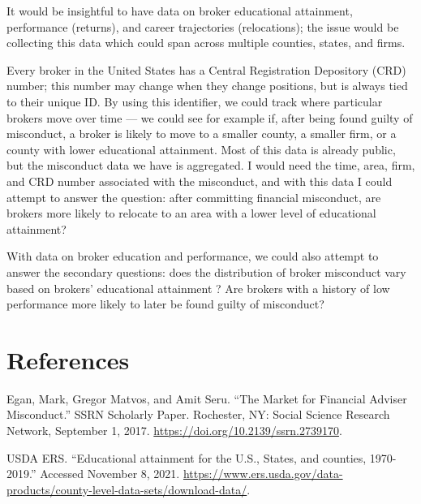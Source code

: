 \documentclass[
]{article}
\begin{document}
It would be insightful to have data on broker educational attainment,
performance (returns), and career trajectories (relocations); the issue
would be collecting this data which could span across multiple counties,
states, and firms.

Every broker in the United States has a Central Registration Depository
(CRD) number; this number may change when they change positions, but is
always tied to their unique ID. By using this identifier, we could track
where particular brokers move over time --- we could see for example if,
after being found guilty of misconduct, a broker is likely to move to a
smaller county, a smaller firm, or a county with lower educational
attainment. Most of this data is already public, but the misconduct data
we have is aggregated. I would need the time, area, firm, and CRD number
associated with the misconduct, and with this data I could attempt to
answer the question: after committing financial misconduct, are brokers
more likely to relocate to an area with a lower level of educational
attainment?

With data on broker education and performance, we could also attempt to
answer the secondary questions: does the distribution of broker
misconduct vary based on brokers' educational attainment ? Are brokers
with a history of low performance more likely to later be found guilty
of misconduct?

\hypertarget{references}{%
\section{References}\label{references}}

Egan, Mark, Gregor Matvos, and Amit Seru. ``The Market for Financial
Adviser Misconduct.'' SSRN Scholarly Paper. Rochester, NY: Social
Science Research Network, September 1, 2017.
\url{https://doi.org/10.2139/ssrn.2739170}.

USDA ERS. ``Educational attainment for the U.S., States, and counties,
1970-2019.'' Accessed November 8, 2021.
\url{https://www.ers.usda.gov/data-products/county-level-data-sets/download-data/}.
\end{document}
